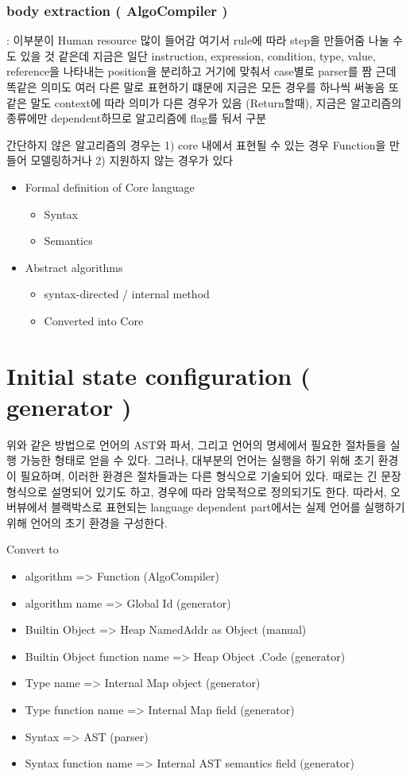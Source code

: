 \subsubsection{body extraction ( AlgoCompiler )} : 이부분이 Human resource 많이 들어감
여기서 rule에 따라 step을 만들어줌
나눌 수도 있을 것 같은데 지금은 일단 instruction, expression, condition, type, value, reference을 나타내는 position을 분리하고 거기에 맞춰서 case별로 parser를 짬
근데 똑같은 의미도 여러 다른 말로 표현하기 떄문에 지금은 모든 경우를 하나씩 써놓음
또 같은 말도 context에 따라 의미가 다른 경우가 있음 (Return할때), 지금은 알고리즘의 종류에만 dependent하므로 알고리즘에 flag를 둬서 구분

간단하지 않은 알고리즘의 경우는 1) core 내에서 표현될 수 있는 경우 Function을 만들어 모델링하거나 
2) 지원하지 않는 경우가 있다


\begin{itemize}
  \item Formal definition of Core language
    \begin{itemize}
      \item Syntax
      \item Semantics
    \end{itemize}
  \item Abstract algorithms
    \begin{itemize}
      \item syntax-directed / internal method
      \item Converted into Core
    \end{itemize}
\end{itemize}

\section{ Initial state configuration ( generator ) }

위와 같은 방법으로 언어의 AST와 파서, 그리고 언어의 명세에서 필요한 절차들을 실행 가능한 형태로 얻을 수 있다. 그러나, 대부분의 언어는 실행을 하기 위해 초기 환경이 필요하며, 이러한 환경은 절차들과는 다른 형식으로 기술되어 있다. 때로는 긴 문장 형식으로 설명되어 있기도 하고, 경우에 따라 암묵적으로 정의되기도 한다. 따라서, 오버뷰에서 블랙박스로 표현되는 language dependent part에서는 실제 언어를 실행하기 위해 언어의 초기 환경을 구성한다. 


Convert to
\begin{itemize}
\item algorithm => Function (AlgoCompiler)
\item algorithm name => Global Id (generator)
\item Builtin Object => Heap NamedAddr as Object (manual)
\item Builtin Object function name => Heap Object .Code (generator)
\item Type name => Internal Map object (generator)
\item Type function name => Internal Map field (generator)
\item Syntax => AST (parser)
\item Syntax function name => Internal AST semantics field (generator)
\end{itemize}


